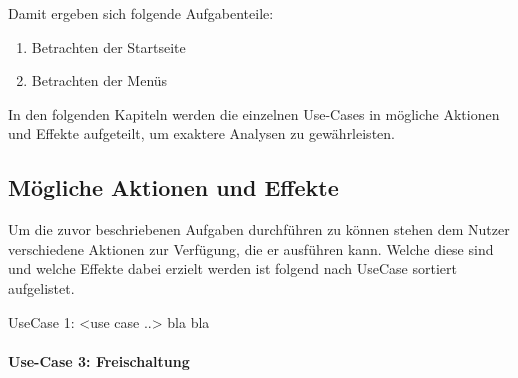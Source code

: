 Damit ergeben sich folgende Aufgabenteile:
\begin{enumerate}
	\item Betrachten der Startseite
	\item Betrachten der Menüs
\end{enumerate}


In den folgenden Kapiteln werden die einzelnen Use-Cases in mögliche Aktionen und Effekte aufgeteilt, um exaktere Analysen zu gewährleisten.

\subsection{Mögliche Aktionen und Effekte}
Um die zuvor beschriebenen Aufgaben durchführen zu können stehen dem Nutzer verschiedene Aktionen zur Verfügung, die er ausführen kann. Welche diese sind und welche Effekte dabei erzielt werden ist folgend nach UseCase sortiert aufgelistet.

UseCase 1: <use case ..>
bla bla

\paragraph{Use-Case 3: Freischaltung}\quad \\
\begin{itemize}

\end{itemize}

